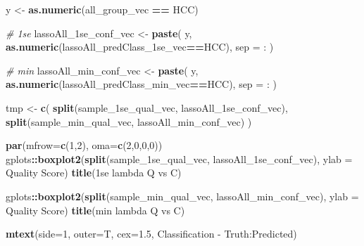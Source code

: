\documentclass[
]{book}
\newenvironment{Shaded}{\begin{snugshade}}{\end{snugshade}}
\newcommand{\CommentTok}[1]{\textcolor[rgb]{0.56,0.35,0.01}{\textit{#1}}}
\newcommand{\DataTypeTok}[1]{\textcolor[rgb]{0.13,0.29,0.53}{#1}}
\newcommand{\DecValTok}[1]{\textcolor[rgb]{0.00,0.00,0.81}{#1}}
\newcommand{\FloatTok}[1]{\textcolor[rgb]{0.00,0.00,0.81}{#1}}
\newcommand{\KeywordTok}[1]{\textcolor[rgb]{0.13,0.29,0.53}{\textbf{#1}}}
\newcommand{\NormalTok}[1]{#1}
\newcommand{\OperatorTok}[1]{\textcolor[rgb]{0.81,0.36,0.00}{\textbf{#1}}}
\newcommand{\StringTok}[1]{\textcolor[rgb]{0.31,0.60,0.02}{#1}}
\begin{document}
\begin{Shaded}
\begin{Highlighting}[]
\NormalTok{y <{-}}\StringTok{ }\KeywordTok{as.numeric}\NormalTok{(all\_group\_vec }\OperatorTok{==}\StringTok{ \textquotesingle{}HCC\textquotesingle{}}\NormalTok{)}

\CommentTok{\# 1se}
\NormalTok{lassoAll\_1se\_conf\_vec <{-}}\StringTok{ }\KeywordTok{paste}\NormalTok{(}
\NormalTok{ y, }
 \KeywordTok{as.numeric}\NormalTok{(lassoAll\_predClass\_1se\_vec}\OperatorTok{==}\StringTok{\textquotesingle{}HCC\textquotesingle{}}\NormalTok{),}
 \DataTypeTok{sep =} \StringTok{\textquotesingle{}:\textquotesingle{}}
\NormalTok{)}

\CommentTok{\# min}
\NormalTok{lassoAll\_min\_conf\_vec <{-}}\StringTok{ }\KeywordTok{paste}\NormalTok{(}
\NormalTok{ y, }
 \KeywordTok{as.numeric}\NormalTok{(lassoAll\_predClass\_min\_vec}\OperatorTok{==}\StringTok{\textquotesingle{}HCC\textquotesingle{}}\NormalTok{),}
 \DataTypeTok{sep =} \StringTok{\textquotesingle{}:\textquotesingle{}}
\NormalTok{)}


\NormalTok{tmp <{-}}\StringTok{ }\KeywordTok{c}\NormalTok{(}
 \KeywordTok{split}\NormalTok{(sample\_1se\_qual\_vec, lassoAll\_1se\_conf\_vec), }
 \KeywordTok{split}\NormalTok{(sample\_min\_qual\_vec, lassoAll\_min\_conf\_vec)}
\NormalTok{)}

\KeywordTok{par}\NormalTok{(}\DataTypeTok{mfrow=}\KeywordTok{c}\NormalTok{(}\DecValTok{1}\NormalTok{,}\DecValTok{2}\NormalTok{), }\DataTypeTok{oma=}\KeywordTok{c}\NormalTok{(}\DecValTok{2}\NormalTok{,}\DecValTok{0}\NormalTok{,}\DecValTok{0}\NormalTok{,}\DecValTok{0}\NormalTok{))}
\NormalTok{gplots}\OperatorTok{::}\KeywordTok{boxplot2}\NormalTok{(}\KeywordTok{split}\NormalTok{(sample\_1se\_qual\_vec, lassoAll\_1se\_conf\_vec), }\DataTypeTok{ylab =} \StringTok{\textquotesingle{}Quality Score\textquotesingle{}}\NormalTok{)}
\KeywordTok{title}\NormalTok{(}\StringTok{\textquotesingle{}1se lambda Q vs C\textquotesingle{}}\NormalTok{)}

\NormalTok{gplots}\OperatorTok{::}\KeywordTok{boxplot2}\NormalTok{(}\KeywordTok{split}\NormalTok{(sample\_min\_qual\_vec, lassoAll\_min\_conf\_vec), }\DataTypeTok{ylab =} \StringTok{\textquotesingle{}Quality Score\textquotesingle{}}\NormalTok{)}
\KeywordTok{title}\NormalTok{(}\StringTok{\textquotesingle{}min lambda Q vs C\textquotesingle{}}\NormalTok{)}


\KeywordTok{mtext}\NormalTok{(}\DataTypeTok{side=}\DecValTok{1}\NormalTok{, }\DataTypeTok{outer=}\NormalTok{T, }\DataTypeTok{cex=}\FloatTok{1.5}\NormalTok{, }\StringTok{\textquotesingle{}Classification {-} Truth:Predicted\textquotesingle{}}\NormalTok{)}
\end{Highlighting}
\end{Shaded}
\end{document}
